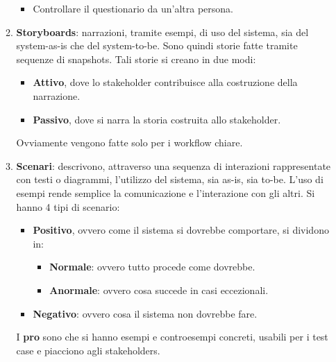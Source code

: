 \begin{itemize}
\begin{enumerate}
\begin{itemize}
                              \item Controllare il questionario da un'altra persona.
                        \end{itemize}
                  \item \textbf{Storyboards}: narrazioni, tramite esempi, di uso
                        del sistema, sia del system-as-is che del system-to-be.
                        Sono quindi storie fatte tramite sequenze di snapshots.
                        Tali storie si creano in due modi:
                        \begin{itemize}
                              \item \textbf{Attivo}, dove lo stakeholder contribuisce
                                    alla costruzione della narrazione.
                              \item \textbf{Passivo}, dove si narra la storia
                                    costruita allo stakeholder.
                        \end{itemize}
                        Ovviamente vengono fatte solo per i workflow chiare.
                  \item \textbf{Scenari}: descrivono, attraverso una sequenza di
                        interazioni rappresentate con testi o diagrammi, l'utilizzo
                        del sistema, sia as-is, sia to-be. L'uso di esempi rende
                        semplice la comunicazione e l'interazione con gli altri.
                        Si hanno 4 tipi di scenario:
                        \begin{itemize}
                              \item \textbf{Positivo}, ovvero come il sistema si
                                    dovrebbe comportare, si dividono in:
                                    \begin{itemize}
                                          \item \textbf{Normale}: ovvero tutto
                                                procede come dovrebbe.
                                          \item \textbf{Anormale}: ovvero cosa
                                                succede in casi eccezionali.
                                    \end{itemize}
                              \item \textbf{Negativo}: ovvero cosa il sistema
                                    non dovrebbe fare.
                        \end{itemize}
                        I \textbf{pro} sono che si hanno esempi e controesempi
                        concreti, usabili per i test case e piacciono agli
                        stakeholders.


\end{enumerate}
\end{itemize}
